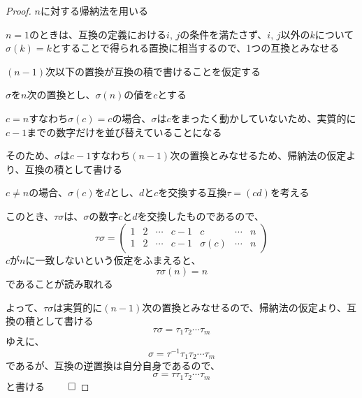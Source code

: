 \documentclass[../../../topic_linear-algebra]{subfiles}
\begin{document}
\begin{proof}
  $n$に対する帰納法を用いる

  \br

  $n=1$のときは、互換の定義における$i,\,j$の条件を満たさず、$i,\,j$以外の$k$について$\sigma(k)=k$とすることで得られる置換に相当するので、1つの互換とみなせる

  \br

  $(n-1)$次以下の置換が互換の積で書けることを仮定する

  $\sigma$を$n$次の置換とし、$\sigma(n)$の値を$c$とする

  \br

  $c=n$すなわち$\sigma(c)=c$の場合、$\sigma$は$c$をまったく動かしていないため、実質的に$c-1$までの数字だけを並び替えていることになる

  そのため、$\sigma$は$c-1$すなわち$(n-1)$次の置換とみなせるため、帰納法の仮定より、互換の積として書ける

  \br

  $c \neq n$の場合、$\sigma(c)$を$d$とし、$d$と$c$を交換する互換$\tau = (cd)$を考える

  このとき、$\tau\sigma$は、$\sigma$の数字$c$と$d$を交換したものであるので、
  \begin{equation*}
    \tau\sigma = \begin{pmatrix}
      1 & 2 & \cdots & c-1 & c         & \cdots & n \\
      1 & 2 & \cdots & c-1 & \sigma(c) & \cdots & n
    \end{pmatrix}
  \end{equation*}
  $c$が$n$に一致しないという仮定をふまえると、
  \begin{equation*}
    \tau\sigma(n) = n
  \end{equation*}
  であることが読み取れる

  よって、$\tau\sigma$は実質的に$(n-1)$次の置換とみなせるので、帰納法の仮定より、互換の積として書ける
  \begin{equation*}
    \tau\sigma = \tau_1 \tau_2 \cdots \tau_m
  \end{equation*}
  ゆえに、
  \begin{equation*}
    \sigma = \tau^{-1}\tau_1 \tau_2 \cdots \tau_m
  \end{equation*}
  であるが、互換の逆置換は自分自身であるので、
  \begin{equation*}
    \sigma = \tau \tau_1 \tau_2 \cdots \tau_m
  \end{equation*}
  と書ける $\qed$
\end{proof}
\end{document}
